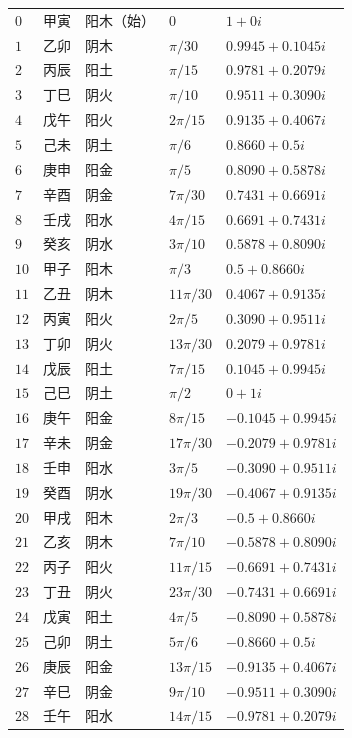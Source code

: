 \begin{longtable}{>{\centering\arraybackslash}p{1cm}>{\centering\arraybackslash}p{1.5cm}>{\centering\arraybackslash}p{1.5cm}>{\centering\arraybackslash}p{2cm}>{\centering\arraybackslash}p{3.5cm}}
$0$ & 甲寅 & 阳木（始） & $0$ & $1+0i$ \\
$1$ & 乙卯 & 阴木 & $\pi/30$ & $0.9945+0.1045i$ \\
$2$ & 丙辰 & 阳土 & $\pi/15$ & $0.9781+0.2079i$ \\
$3$ & 丁巳 & 阴火 & $\pi/10$ & $0.9511+0.3090i$ \\
$4$ & 戊午 & 阳火 & $2\pi/15$ & $0.9135+0.4067i$ \\
$5$ & 己未 & 阴土 & $\pi/6$ & $0.8660+0.5i$ \\
$6$ & 庚申 & 阳金 & $\pi/5$ & $0.8090+0.5878i$ \\
$7$ & 辛酉 & 阴金 & $7\pi/30$ & $0.7431+0.6691i$ \\
$8$ & 壬戌 & 阳水 & $4\pi/15$ & $0.6691+0.7431i$ \\
$9$ & 癸亥 & 阴水 & $3\pi/10$ & $0.5878+0.8090i$ \\
$10$ & 甲子 & 阳木 & $\pi/3$ & $0.5+0.8660i$ \\
$11$ & 乙丑 & 阴木 & $11\pi/30$ & $0.4067+0.9135i$ \\
$12$ & 丙寅 & 阳火 & $2\pi/5$ & $0.3090+0.9511i$ \\
$13$ & 丁卯 & 阴火 & $13\pi/30$ & $0.2079+0.9781i$ \\
$14$ & 戊辰 & 阳土 & $7\pi/15$ & $0.1045+0.9945i$ \\
$15$ & 己巳 & 阴土 & $\pi/2$ & $0+1i$ \\
$16$ & 庚午 & 阳金 & $8\pi/15$ & $-0.1045+0.9945i$ \\
$17$ & 辛未 & 阴金 & $17\pi/30$ & $-0.2079+0.9781i$ \\
$18$ & 壬申 & 阳水 & $3\pi/5$ & $-0.3090+0.9511i$ \\
$19$ & 癸酉 & 阴水 & $19\pi/30$ & $-0.4067+0.9135i$ \\
$20$ & 甲戌 & 阳木 & $2\pi/3$ & $-0.5+0.8660i$ \\
$21$ & 乙亥 & 阴木 & $7\pi/10$ & $-0.5878+0.8090i$ \\
$22$ & 丙子 & 阳火 & $11\pi/15$ & $-0.6691+0.7431i$ \\
$23$ & 丁丑 & 阴火 & $23\pi/30$ & $-0.7431+0.6691i$ \\
$24$ & 戊寅 & 阳土 & $4\pi/5$ & $-0.8090+0.5878i$ \\
$25$ & 己卯 & 阴土 & $5\pi/6$ & $-0.8660+0.5i$ \\
$26$ & 庚辰 & 阳金 & $13\pi/15$ & $-0.9135+0.4067i$ \\
$27$ & 辛巳 & 阴金 & $9\pi/10$ & $-0.9511+0.3090i$ \\
$28$ & 壬午 & 阳水 & $14\pi/15$ & $-0.9781+0.2079i$ \\

\end{longtable}
